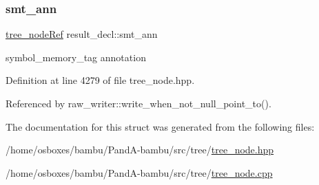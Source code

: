 \mbox{\label{structresult__decl_a5d43f8fb419b7fd6dde366912e535bf0}} 
\subsubsection{\texorpdfstring{smt\+\_\+ann}{smt\_ann}}
{\footnotesize\ttfamily \hyperlink{tree__node_8hpp_a6ee377554d1c4871ad66a337eaa67fd5}{tree\+\_\+node\+Ref} result\+\_\+decl\+::smt\+\_\+ann}



symbol\+\_\+memory\+\_\+tag annotation 



Definition at line 4279 of file tree\+\_\+node.\+hpp.



Referenced by raw\+\_\+writer\+::write\+\_\+when\+\_\+not\+\_\+null\+\_\+point\+\_\+to().



The documentation for this struct was generated from the following files\+:\begin{DoxyCompactItemize}
\item 
/home/osboxes/bambu/\+Pand\+A-\/bambu/src/tree/\hyperlink{tree__node_8hpp}{tree\+\_\+node.\+hpp}\item 
/home/osboxes/bambu/\+Pand\+A-\/bambu/src/tree/\hyperlink{tree__node_8cpp}{tree\+\_\+node.\+cpp}\end{DoxyCompactItemize}
